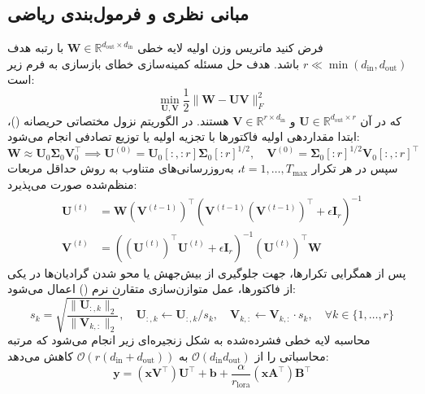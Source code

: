 \subsection{مبانی نظری و فرمول‌بندی ریاضی}
فرض کنید ماتریس وزن اولیه لایه خطی $\mathbf{W} \in \mathbb{R}^{d_{\text{out}} \times d_{\text{in}}}$ با رتبه هدف $r \ll \min(d_{\text{in}}, d_{\text{out}})$ باشد. هدف حل مسئله کمینه‌سازی خطای بازسازی به فرم زیر است:
\begin{equation}
\min_{\mathbf{U}, \mathbf{V}} \frac{1}{2} \|\mathbf{W} - \mathbf{U} \mathbf{V}\|_F^2
\end{equation}
که در آن $\mathbf{U} \in \mathbb{R}^{d_{\text{out}} \times r}$ و $\mathbf{V} \in \mathbb{R}^{r \times d_{\text{in}}}$ هستند. در الگوریتم نزول مختصاتی حریصانه ()، ابتدا مقداردهی اولیه فاکتورها با تجزیه اولیه  یا توزیع تصادفی انجام می‌شود:
\begin{equation}
\mathbf{W} \approx \mathbf{U}_0 \mathbf{\Sigma}_0 \mathbf{V}_0^\top \implies \mathbf{U}^{(0)} = \mathbf{U}_0[:, :r] \mathbf{\Sigma}_0[:r]^{1/2}, \quad \mathbf{V}^{(0)} = \mathbf{\Sigma}_0[:r]^{1/2} \mathbf{V}_0[:, :r]^\top
\end{equation}
سپس در هر تکرار $t = 1, \dots, T_{\text{max}}$، به‌روزرسانی‌های متناوب به روش حداقل مربعات منظم‌شده صورت می‌پذیرد:
\begin{align}
\mathbf{U}^{(t)} &= \mathbf{W} (\mathbf{V}^{(t-1)})^\top \left( \mathbf{V}^{(t-1)} (\mathbf{V}^{(t-1)})^\top + \epsilon \mathbf{I}_r \right)^{-1} \\
\mathbf{V}^{(t)} &= \left( (\mathbf{U}^{(t)})^\top \mathbf{U}^{(t)} + \epsilon \mathbf{I}_r \right)^{-1} (\mathbf{U}^{(t)})^\top \mathbf{W}
\end{align}
پس از همگرایی تکرارها، جهت جلوگیری از بیش‌جهش یا محو شدن گرادیان‌ها در یکی از فاکتورها، عمل متوازن‌سازی متقارن نرم () اعمال می‌شود:
\begin{equation}
s_k = \sqrt{\frac{\|\mathbf{U}_{:, k}\|_2}{\|\mathbf{V}_{k, :}\|_2}}, \quad \mathbf{U}_{:, k} \leftarrow \mathbf{U}_{:, k} / s_k, \quad \mathbf{V}_{k, :} \leftarrow \mathbf{V}_{k, :} \cdot s_k, \quad \forall k \in \{1, \dots, r\}
\end{equation}
محاسبه لایه خطی فشرده‌شده به شکل زنجیره‌ای زیر انجام می‌شود که مرتبه محاسباتی را از $\mathcal{O}(d_{\text{in}} d_{\text{out}})$ به $\mathcal{O}(r(d_{\text{in}} + d_{\text{out}}))$ کاهش می‌دهد:
\begin{equation}
\mathbf{y} = (\mathbf{x} \mathbf{V}^\top) \mathbf{U}^\top + \mathbf{b} + \frac{\alpha}{r_{\text{lora}}} (\mathbf{x} \mathbf{A}^\top) \mathbf{B}^\top
\end{equation}

